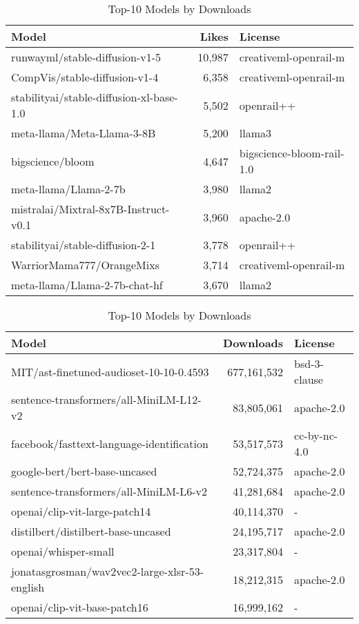 \begin{table}[t!]
\caption{Top-10 Models by Likes}
\label{tab:top_models_likes}
\begin{tabular}{lrl}
\hline
\textbf{Model} & \textbf{Likes} & \textbf{License} \\ \hline
runwayml/stable-diffusion-v1-5 & 10,987 & creativeml-openrail-m \\
CompVis/stable-diffusion-v1-4 & 6,358 & creativeml-openrail-m \\
stabilityai/stable-diffusion-xl-base-1.0 & 5,502 & openrail++ \\
meta-llama/Meta-Llama-3-8B & 5,200 & llama3 \\
bigscience/bloom & 4,647 & bigscience-bloom-rail-1.0 \\
meta-llama/Llama-2-7b & 3,980 & llama2 \\
mistralai/Mixtral-8x7B-Instruct-v0.1 & 3,960 & apache-2.0 \\
stabilityai/stable-diffusion-2-1 & 3,778 & openrail++ \\
WarriorMama777/OrangeMixs & 3,714 & creativeml-openrail-m \\
meta-llama/Llama-2-7b-chat-hf & 3,670 & llama2 \\ \hline
\end{tabular}%

\bigskip

\caption{Top-10 Models by Downloads}
\label{tab:top_models_downloads}
\begin{tabular}{lrl}
\hline
\textbf{Model} & \textbf{Downloads} & \textbf{License} \\ \hline
MIT/ast-finetuned-audioset-10-10-0.4593 & 677,161,532 & bsd-3-clause \\
sentence-transformers/all-MiniLM-L12-v2 & 83,805,061 & apache-2.0 \\
facebook/fasttext-language-identification & 53,517,573 & cc-by-nc-4.0 \\
google-bert/bert-base-uncased & 52,724,375 & apache-2.0 \\
sentence-transformers/all-MiniLM-L6-v2 & 41,281,684 & apache-2.0 \\
openai/clip-vit-large-patch14 & 40,114,370 & - \\
distilbert/distilbert-base-uncased & 24,195,717 & apache-2.0 \\
openai/whisper-small & 23,317,804 & - \\
jonatasgrosman/wav2vec2-large-xlsr-53-english & 18,212,315 & apache-2.0 \\
openai/clip-vit-base-patch16 & 16,999,162 & - \\ \hline
\end{tabular}%
\end{table}


